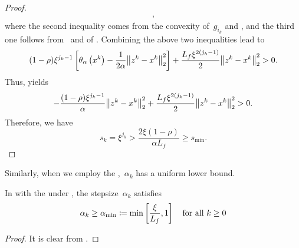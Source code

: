 \documentclass[../../main]{subfiles}
\begin{document}
\begin{proof}
\begin{align}
        ,\end{align}
    where the second inequality comes from the convexity of~$g_{i_k}$ and , and the third one follows from~ and  of .
    Combining the above two inequalities lead to
    \begin{equation}
        (1 - \rho) \xi^{j_k - 1} \left[ \theta_\alpha\left(x^k\right) - \frac{1}{2 \alpha} \norm*{z^k - x^k}_2^2 \right] + \frac{L_f \xi^{2 (j_k - 1)}}{2} \norm*{z^k - x^k}_2^2 > 0
        .\end{equation}
    Thus,  yields
    \begin{equation}
        - \frac{(1 - \rho) \xi^{j_k - 1}}{\alpha} \norm*{z^k - x^k}_2^2 + \frac{L_f \xi^{2 (j_k - 1)}}{2} \norm*{z^k - x^k}_2^2 > 0
        .\end{equation}
    Therefore, we have
    \begin{equation}
        s_k = \xi^{j_k} > \frac{2 \xi (1 - \rho)}{\alpha L_f} \ge s_{\min}
        .\end{equation}
\end{proof}

Similarly, when we employ the ,~$\alpha_k$ has a uniform lower bound.
\begin{lemma} 
    In  with the  under , the stepsize~$\alpha_k$ satisfies
    \begin{equation}
        \alpha_k \ge \alpha_{\min} \coloneqq \min \left[\frac{\xi}{L_f}, 1\right] \quad \text{for all~$k \ge 0$}
    \end{equation}
\end{lemma}
\begin{proof}
    It is clear from .
\end{proof}
\end{document}
